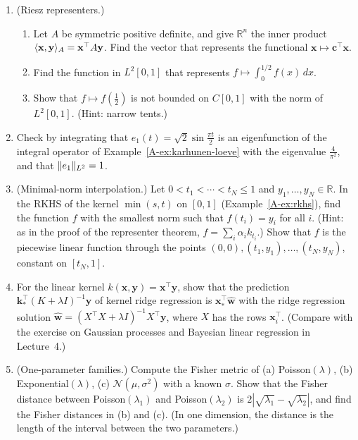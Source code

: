 \begin{enumerate}[leftmargin=*]
    \item (Riesz representers.)
    \begin{enumerate}[label=(\alph*)]
        \item Let $A$ be symmetric positive definite, and give $\mathbb{R}^n$ the inner product $\langle \mathbf{x}, \mathbf{y} \rangle_A = \mathbf{x}^\top A\mathbf{y}$. Find the vector that represents the functional $\mathbf{x} \mapsto \mathbf{c}^\top\mathbf{x}$.
        \item Find the function in $L^2[0, 1]$ that represents $f \mapsto \int_0^{1/2} f(x)\, dx$.
        \item Show that $f \mapsto f(\frac{1}{2})$ is not bounded on $C[0, 1]$ with the norm of $L^2[0, 1]$. (Hint: narrow tents.)
    \end{enumerate}
    \item Check by integrating that $e_1(t) = \sqrt{2}\sin\frac{\pi t}{2}$ is an eigenfunction of the integral operator of Example~\ref{A-ex:karhunen-loeve} with the eigenvalue $\frac{4}{\pi^2}$, and that $\lVert e_1 \rVert_{L^2} = 1$.
    \item (Minimal-norm interpolation.) Let $0 < t_1 < \cdots < t_N \leq 1$ and $y_1, \ldots, y_N \in \mathbb{R}$. In the RKHS of the kernel $\min(s, t)$ on $[0, 1]$ (Example~\ref{A-ex:rkhs}), find the function $f$ with the smallest norm such that $f(t_i) = y_i$ for all $i$. (Hint: as in the proof of the representer theorem, $f = \sum_i \alpha_ik_{t_i}$.) Show that $f$ is the piecewise linear function through the points $(0, 0), (t_1, y_1), \ldots, (t_N, y_N)$, constant on $[t_N, 1]$.
    \item For the linear kernel $k(\mathbf{x}, \mathbf{y}) = \mathbf{x}^\top\mathbf{y}$, show that the prediction $\mathbf{k}_*^\top(K + \lambda I)^{-1}\mathbf{y}$ of kernel ridge regression is $\mathbf{x}_*^\top\hat{\mathbf{w}}$ with the ridge regression solution $\hat{\mathbf{w}} = (X^\top X + \lambda I)^{-1}X^\top\mathbf{y}$, where $X$ has the rows $\mathbf{x}_i^\top$. (Compare with the exercise on Gaussian processes and Bayesian linear regression in Lecture~4.)
    \item (One-parameter families.) Compute the Fisher metric of (a) Poisson$(\lambda)$, (b) Exponential$(\lambda)$, (c) $\mathcal{N}(\mu, \sigma^2)$ with a known $\sigma$. Show that the Fisher distance between Poisson$(\lambda_1)$ and Poisson$(\lambda_2)$ is $2|\sqrt{\lambda_1} - \sqrt{\lambda_2}|$, and find the Fisher distances in (b) and (c). (In one dimension, the distance is the length of the interval between the two parameters.)

\end{enumerate}

